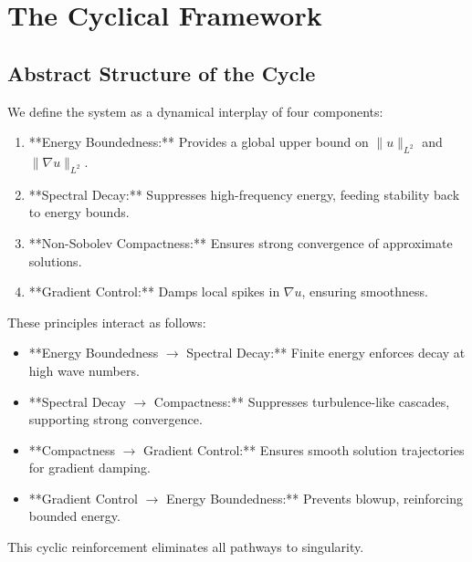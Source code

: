 \documentclass[12pt]{article}
\begin{document}
\section{The Cyclical Framework}

\subsection{Abstract Structure of the Cycle}
We define the system as a dynamical interplay of four components:
\begin{enumerate}
    \item **Energy Boundedness:** Provides a global upper bound on $\|u\|_{L^2}$ and $\|\nabla u\|_{L^2}$.
    \item **Spectral Decay:** Suppresses high-frequency energy, feeding stability back to energy bounds.
    \item **Non-Sobolev Compactness:** Ensures strong convergence of approximate solutions.
    \item **Gradient Control:** Damps local spikes in $\nabla u$, ensuring smoothness.
\end{enumerate}
These principles interact as follows:
\begin{itemize}
    \item **Energy Boundedness \(\to\) Spectral Decay:** Finite energy enforces decay at high wave numbers.
    \item **Spectral Decay \(\to\) Compactness:** Suppresses turbulence-like cascades, supporting strong convergence.
    \item **Compactness \(\to\) Gradient Control:** Ensures smooth solution trajectories for gradient damping.
    \item **Gradient Control \(\to\) Energy Boundedness:** Prevents blowup, reinforcing bounded energy.
\end{itemize}
This cyclic reinforcement eliminates all pathways to singularity.
\end{document}
